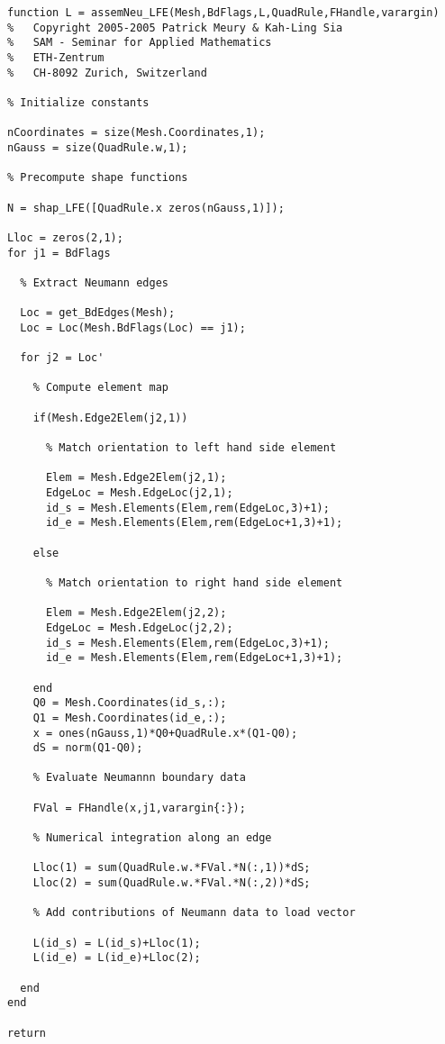 \begin{lstlisting}
function L = assemNeu_LFE(Mesh,BdFlags,L,QuadRule,FHandle,varargin)
%   Copyright 2005-2005 Patrick Meury & Kah-Ling Sia
%   SAM - Seminar for Applied Mathematics
%   ETH-Zentrum
%   CH-8092 Zurich, Switzerland

% Initialize constants

nCoordinates = size(Mesh.Coordinates,1);
nGauss = size(QuadRule.w,1);
  
% Precompute shape functions
  
N = shap_LFE([QuadRule.x zeros(nGauss,1)]);
  
Lloc = zeros(2,1);
for j1 = BdFlags
  
  % Extract Neumann edges
  
  Loc = get_BdEdges(Mesh);
  Loc = Loc(Mesh.BdFlags(Loc) == j1);
    
  for j2 = Loc'
        
    % Compute element map
      
    if(Mesh.Edge2Elem(j2,1))
          
      % Match orientation to left hand side element
        
      Elem = Mesh.Edge2Elem(j2,1);
      EdgeLoc = Mesh.EdgeLoc(j2,1);
      id_s = Mesh.Elements(Elem,rem(EdgeLoc,3)+1);
      id_e = Mesh.Elements(Elem,rem(EdgeLoc+1,3)+1);
          
    else
        
      % Match orientation to right hand side element  
          
      Elem = Mesh.Edge2Elem(j2,2);
      EdgeLoc = Mesh.EdgeLoc(j2,2);
      id_s = Mesh.Elements(Elem,rem(EdgeLoc,3)+1);
      id_e = Mesh.Elements(Elem,rem(EdgeLoc+1,3)+1);
        
    end
    Q0 = Mesh.Coordinates(id_s,:);
    Q1 = Mesh.Coordinates(id_e,:);
    x = ones(nGauss,1)*Q0+QuadRule.x*(Q1-Q0);
    dS = norm(Q1-Q0);
      
    % Evaluate Neumannn boundary data
      
    FVal = FHandle(x,j1,varargin{:});
      
    % Numerical integration along an edge
    
    Lloc(1) = sum(QuadRule.w.*FVal.*N(:,1))*dS;
    Lloc(2) = sum(QuadRule.w.*FVal.*N(:,2))*dS;
  
    % Add contributions of Neumann data to load vector
      
    L(id_s) = L(id_s)+Lloc(1);
    L(id_e) = L(id_e)+Lloc(2);
      
  end    
end
  
return
\end{lstlisting}

